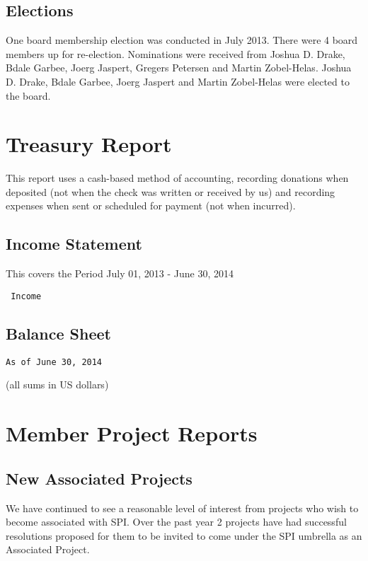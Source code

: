 \documentclass[letterpaper]{report}
\begin{document}
\section{Elections}

One board membership election was conducted in July 2013. There were 4
board members up for re-election.  Nominations were received from Joshua D.
Drake, Bdale Garbee, Joerg Jaspert, Gregers Petersen and Martin
Zobel-Helas.  Joshua D. Drake, Bdale Garbee, Joerg Jaspert and Martin
Zobel-Helas were elected to the board.

\chapter{Treasury Report}

This report uses a cash-based method of accounting, recording donations when
deposited (not when the check was written or received by us) and recording
expenses when sent or scheduled for payment (not when incurred).

\section{Income Statement}

This covers the Period July 01, 2013 - June 30, 2014

\begin{verbatim}
 Income
\end{verbatim}

\section{Balance Sheet}

\begin{verbatim}
As of June 30, 2014
\end{verbatim}

(all sums in US dollars)


\chapter{Member Project Reports}

\section{New Associated Projects}

We have continued to see a reasonable level of interest from projects who wish
to become associated with SPI. Over the past year 2 projects have had
successful resolutions proposed for them to be invited to come under the SPI
umbrella as an Associated Project.
\end{document}
